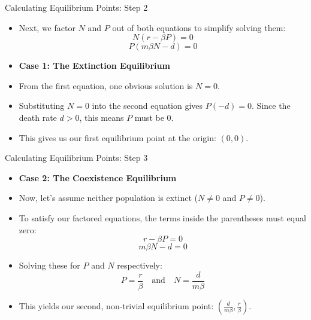 \begin{frame}{Calculating Equilibrium Points: Step 2}
    
    \begin{itemize}
        \item Next, we factor $N$ and $P$ out of both equations to simplify solving them:
        \begin{equation}
            N(r - \beta P) = 0
        \end{equation}
        \begin{equation}
            P(m\beta N - d) = 0
        \end{equation}
        \pause
        \vspace{1em}
        \item \textbf{Case 1: The Extinction Equilibrium}
        \item From the first equation, one obvious solution is $N = 0$.
        \pause
        \item Substituting $N = 0$ into the second equation gives $P(-d) = 0$. Since the death rate $d > 0$, this means $P$ must be $0$.
        \item This gives us our first equilibrium point at the origin: \textbf{$(0, 0)$}. 
    \end{itemize}
\end{frame}

\begin{frame}{Calculating Equilibrium Points: Step 3}
    \begin{itemize}
        \item \textbf{Case 2: The Coexistence Equilibrium}
        \item Now, let's assume neither population is extinct ($N \neq 0$ and $P \neq 0$). 
        \pause
        \item To satisfy our factored equations, the terms inside the parentheses must equal zero:
        \begin{equation}
            r - \beta P = 0
        \end{equation}
        \begin{equation}
            m\beta N - d = 0
        \end{equation}
        \pause
        \item Solving these for $P$ and $N$ respectively:
        \begin{equation}
            P = \frac{r}{\beta} \quad \text{and} \quad N = \frac{d}{m\beta}
        \end{equation}
        \pause
        \item This yields our second, non-trivial equilibrium point: \textbf{$\left( \frac{d}{m\beta}, \frac{r}{\beta} \right)$}.
    \end{itemize}
\end{frame}

